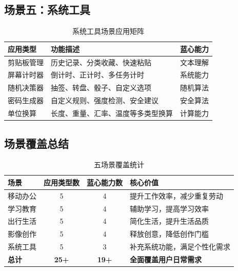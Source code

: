 \documentclass[a4paper,12pt]{ctexart}
\begin{document}
\subsection{场景五：系统工具}

\begin{table}[H]
    \centering
    \caption{系统工具场景应用矩阵}
    \begin{tabularx}{\textwidth}{|l|X|l|}
        \hline
        \textbf{应用类型} & \textbf{功能描述} & \textbf{蓝心能力} \\
        \hline
        剪贴板管理 & 历史记录、分类收藏、快速粘贴 & 文本理解 \\
        \hline
        屏幕计时器 & 倒计时、正计时、多任务计时 & 系统能力 \\
        \hline
        随机决策器 & 抽签、转盘、骰子、自定义选项 & 随机算法 \\
        \hline
        密码生成器 & 自定义规则、强度检测、安全建议 & 安全算法 \\
        \hline
        单位换算 & 长度、重量、汇率、温度等多类型换算 & 计算能力 \\
        \hline
    \end{tabularx}
\end{table}

\subsection{场景覆盖总结}

\begin{table}[H]
    \centering
    \caption{五场景覆盖统计}
    \begin{tabularx}{\textwidth}{|l|c|c|X|}
        \hline
        \textbf{场景} & \textbf{应用类型数} & \textbf{蓝心能力数} & \textbf{核心价值} \\
        \hline
        移动办公 & 5 & 4 & 提升工作效率，减少重复劳动 \\
        \hline
        学习教育 & 5 & 4 & 辅助学习，提高学习效率 \\
        \hline
        出行生活 & 5 & 4 & 简化生活，提升生活品质 \\
        \hline
        影像创作 & 5 & 4 & 释放创意，降低创作门槛 \\
        \hline
        系统工具 & 5 & 3 & 补充系统功能，满足个性化需求 \\
        \hline
        \textbf{总计} & \textbf{25+} & \textbf{19+} & \textbf{全面覆盖用户日常需求} \\
        \hline
    \end{tabularx}
\end{table}
\end{document}
